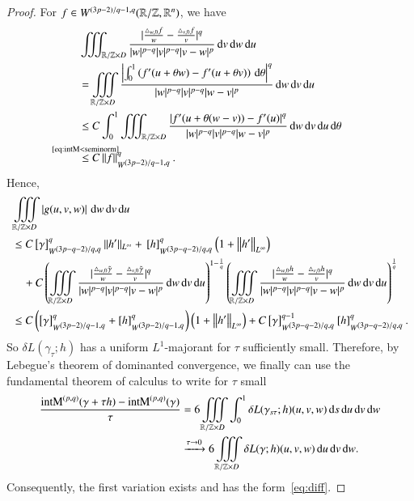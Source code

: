 \begin{proof}
For $f \in \W \rzd$, we have
\begin{equation}\label{eq:esttripleintegral}
\begin{split}
   &\iiint_{\mathbb R / \mathbb Z \times D }\frac{|\frac {\T[f] w0} w - \frac {\T[f] v0} v|^q  }
   {|w|^{p-q} |v|^{p-q} |v-w|^p} \d v \d w \d u \\
  & = \iiint\limits_{\mathbb R / \mathbb Z \times D } 
   \frac{\abs{\int_{0}^{1}\br{f'(u+\theta w)-f'(u+\theta v)}\d\theta}^{q}}{ |w|^{p-q} |v|^{p-q} |w-v|^p} \d w \d v \d u \\
   & \le  C \int_0^{1}\iiint_{\R/\Z\times D } \frac{\abs{f'(u+\theta(w-v))-f'(u)}^{q}}{ |w|^{p-q} |v|^{p-q} |w-v|^p} \d w \d v \d u \d\theta \\
   &\refeq[\le]{intM<seminorm} C\norm f_{{\W}}^{q}.
   \end{split}
\end{equation}
Hence,
\begin{equation}
\begin{split} \label{eq:L1majorant}
&\iiint\limits_{\mathbb R / \mathbb Z \times D }\abs{g(u,v,w)}\d w\d v\d u \\
   &\le C\seminorm \g_{\W[(3p-q-2)/q,q]}^q \|h'\|_{L^\infty} + {}
  \seminorm {h}_{\W[(3p-q-2)/q,q]}^q \br{1+\lnorm[\infty]{h'}}
   \\ & \quad +   C  \left( \iiint\limits_{\mathbb R / \mathbb Z \times D} \frac{|\frac {\T w0} w - \frac {\T v0} v|^q}{|w|^{p-q} |v|^{p-q} |v-w|^p}\d w\d v\d u \right)^{1-\frac 1 q}
   \left( \iiint\limits_{\mathbb R / \mathbb Z \times D} \frac{|\frac {\T[h] w0} w - \frac {\T[h] v0} v|^q}{|w|^{p-q} |v|^{p-q} |v-w|^p} \d w\d v\d u\right)^{\frac 1 q}
  \\
 & \le C \br{\seminorm{\g}_{\W[(3p-2)/q-1,q]}^{q} + \seminorm{h}_{\W[(3p-2)/q-1,q]}^{q}}\br{1+\lnorm[\infty]{h'}}
 +C \seminorm \g_{\W[(3p-q-2)/q,q]}^{q-1}\seminorm {h}_{\W[(3p-q-2)/q,q]}^q.
\end{split}
\end{equation}
So $\delta L(\gamma_\tau; h)$ has a uniform $L^1$-majorant for $\tau$ sufficiently small.
Therefore,
by Lebegue's theorem of dominanted convergence,
we finally can use the fundamental theorem of calculus to write for $\tau$ small
\begin{align*}
 \frac {\E(\gamma+\tau h) - \E(\gamma)}{\tau} 
 &= 6 \iiint\limits_{\mathbb R / \mathbb Z \times D} \int_0^1 \delta L(\gamma_{s \tau};h)(u,v,w) \d s\d u \d v \d w \\
 & \xrightarrow{\tau \rightarrow 0} 6 \iiint\limits_{\mathbb R / \mathbb Z \times D} \delta L (\gamma; h)(u,v,w) \d u \d v \d w.
\end{align*}
Consequently, the first variation exists and has the form~\eqref{eq:diff}.


\end{proof}
